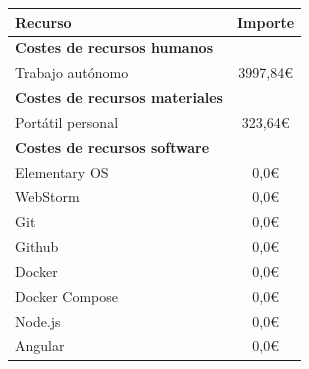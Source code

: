\begin{table}[H]
\centering
\begin{tabular}{lc}
\hline
\textbf{Recurso}                                                                                      & \multicolumn{1}{l}{  \textbf{Importe}} \\ \hline
\textbf{Costes de recursos humanos}                                                                   & \multicolumn{1}{l}{}                 \\
Trabajo autónomo                                                                                      & 3997,84€                            \\ \hline
\textbf{Costes de recursos materiales}                                                                & \multicolumn{1}{l}{}                 \\
Portátil personal                                                                                     & 323,64€                              \\ \hline
\textbf{Costes de recursos software}                                                                  & \multicolumn{1}{l}{}                 \\
Elementary OS                                                                                         & 0,0€                                 \\
WebStorm                                                                                              & 0,0€                                 \\
Git                                                                                                   & 0,0€                                 \\
Github                                                                                                & 0,0€                                 \\
Docker                                                                                                & 0,0€                                 \\
Docker Compose                                                                                        & 0,0€                                 \\
Node.js                                                                                                & 0,0€                                 \\
Angular                                                                                               & 0,0€


\end{tabular}
\end{table}

